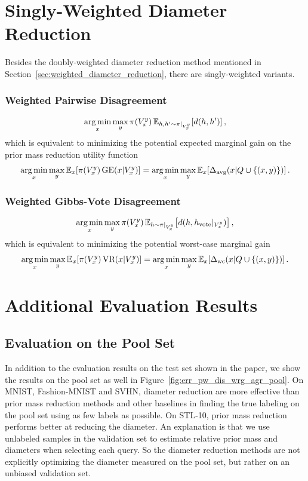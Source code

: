 \documentclass[runningheads, envcountsame, a4paper]{llncs}
\newcommand{\argmin}{\operatornamewithlimits{arg\,min}}
\begin{document}
\section{Singly-Weighted Diameter Reduction}
Besides the doubly-weighted diameter reduction method mentioned in Section~\ref{sec:weighted_diameter_reduction}, there are singly-weighted variants. 
\subsubsection{Weighted Pairwise Disagreement} \begin{align}
    \argmin_x \max_y \pi(V_x^y)\, \mathbb{E}_{h,h^\prime \sim \pi|_{V_x^y}}\! \left[ d(h, h^\prime) \right],
\end{align}
which is equivalent to minimizing the potential expected marginal gain on the prior mass reduction utility function
\begin{align}
\argmin_x \max_y \mathbb{E}_x\! \left[ \pi(V_x^y)\, \text{GE}(x | V_x^y) \right] 
    = \argmin_x \max_y \mathbb{E}_x\! \left[ \Delta_{\text{avg}}(x|Q \cup \{(x,y)\}) \right].
\end{align}

\subsubsection{Weighted Gibbs-Vote Disagreement} \begin{align}
    \argmin_x \max_y \pi(V_x^y)\, \mathbb{E}_{h \sim \pi|_{V_x^y}}\! \left[ d(h, h_{\text{vote}}|_{V_x^y}) \right],
\end{align}
which is equivalent to minimizing the potential worst-case marginal gain 
\begin{align}
\argmin_x \max_y \mathbb{E}_x\! \left[ \pi(V_x^y)\, \text{VR}(x | V_x^y) \right] 
    = \argmin_x \max_y \mathbb{E}_x\! \left[ \Delta_{\text{wc}}(x|Q \cup \{(x,y)\}) \right].
\end{align}





\section{Additional Evaluation Results}
\subsection{Evaluation on the Pool Set}
In addition to the evaluation results on the test set shown in the paper, we show the results on the pool set as well in Figure~\ref{fig:err_pw_dis_wrg_agr_pool}. On MNIST, Fashion-MNIST and SVHN, diameter reduction are more effective than prior mass reduction methods and other baselines in finding the true labeling on the pool set using as few labels as possible. On STL-10, prior mass reduction performs better at reducing the diameter. An explanation is that we use unlabeled samples in the validation set to estimate relative prior mass and diameters when selecting each query. So the diameter reduction methods are not explicitly optimizing the diameter measured on the pool set, but rather on an unbiased validation set.  
\end{document}

